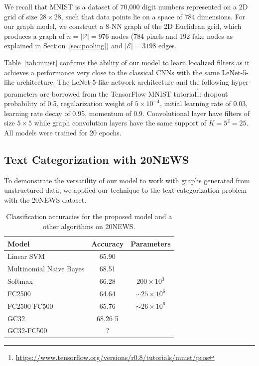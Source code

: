 \documentclass{article}
\newcommand{\V}{\mathcal{V}}
\newcommand{\E}{\mathcal{E}}
\newcommand{\tabref}[1]{Table~\ref{tab:#1}}
\newcommand{\secref}[1]{Section~\ref{sec:#1}}
\newcommand{\todo}[1]{{\color{red} #1 }}
\begin{document}
We recall that MNIST is a dataset of 70,000 digit numbers represented on a 2D grid of size $28
\times 28$, such that data points lie on a space of $784$ dimensions. For
our graph model, we construct a $8$-NN graph of the 2D Euclidean
grid, which produces a graph of $n = |\V| = 976$ nodes (784 pixels and 192 fake
nodes as explained in \secref{pooling}) and $|\E| = 3198$ edges.

\tabref{mnist} confirms the ability of our model to learn localized filters
as it achieves a performance very close to the classical CNNs with the same LeNet-5-like
architecture. The LeNet-5-like network architecture and the following hyper-parameters are
borrowed from the TensorFlow MNIST tutorial\footnote{
\url{https://www.tensorflow.org/versions/r0.8/tutorials/mnist/pros}}: dropout
probability of 0.5, regularization weight of $5\times10^{-4}$, initial learning
rate of 0.03, learning rate decay of 0.95, momentum of 0.9. Convolutional layer
have filters of size $5 \times 5$ while graph convolution layers have the same
support of $K = 5^2 = 25$. All models were trained for 20 epochs.







\subsection{Text Categorization with 20NEWS}
To demonstrate the versatility of our model to work with graphs generated from unstructured data, we applied our technique to the text categorization problem with the 20NEWS dataset.


\begin{table}[h!] \centering
\begin{tabular}{lcc} \toprule
Model & Accuracy & \todo{Parameters} \\
\midrule
Linear SVM & 65.90 \\
Multinomial Naive Bayes & 68.51 \\
Softmax & 66.28 & $200\times10^3$ \\
\addlinespace
FC2500 & 64.64 & $\sim25\times10^6$ \\
FC2500-FC500 & 65.76 & $\sim26\times10^6$ \\
\addlinespace
GC32 & 68.26 5\\
GC32-FC500 & \todo{?} \\
\bottomrule \end{tabular}
\caption{Classification accuracies for the proposed model and a other algorithms
on 20NEWS.} 
\label{tab:20news}
\end{table}
\end{document}
